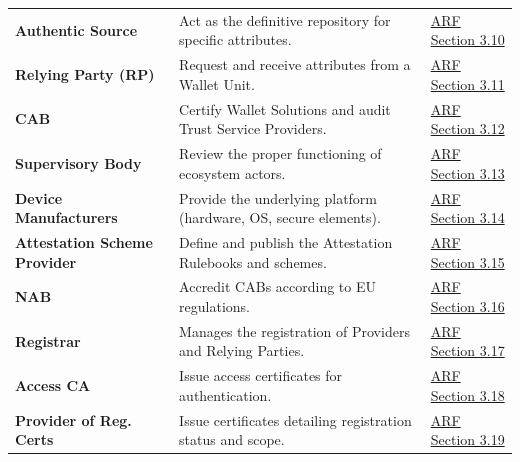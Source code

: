 \documentclass{article}
\begin{document}
\begin{table}[htbp]
\begin{tabularx}{\textwidth}{@{}l L l@{}}
        \textbf{Authentic Source} & Act as the definitive repository for specific attributes. & \href{https://eudi.dev/latest/architecture-and-reference-framework-main/\#310-authentic-sources}{ARF Section 3.10} \\
        \textbf{Relying Party (RP)} & Request and receive attributes from a Wallet Unit. & \href{https://eudi.dev/latest/architecture-and-reference-framework-main/\#311-relying-parties-relying-party-instances-and-intermediaries}{ARF Section 3.11} \\
        \textbf{CAB} & Certify Wallet Solutions and audit Trust Service Providers. & \href{https://eudi.dev/latest/architecture-and-reference-framework-main/\#312-conformity-assessment-bodies-cab}{ARF Section 3.12} \\
        \textbf{Supervisory Body} & Review the proper functioning of ecosystem actors. & \href{https://eudi.dev/latest/architecture-and-reference-framework-main/\#313-supervisory-bodies}{ARF Section 3.13} \\
        \textbf{Device Manufacturers} & Provide the underlying platform (hardware, OS, secure elements). & \href{https://eudi.dev/latest/architecture-and-reference-framework-main/\#314-device-manufacturers-and-related-subsystems-providers}{ARF Section 3.14} \\
        \textbf{Attestation Scheme Provider} & Define and publish the Attestation Rulebooks and schemes. & \href{https://eudi.dev/latest/architecture-and-reference-framework-main/\#315-attestation-scheme-providers-for-qeaas-pub-eaas-and-eaas}{ARF Section 3.15} \\
        \textbf{NAB} & Accredit CABs according to EU regulations. & \href{https://eudi.dev/latest/architecture-and-reference-framework-main/\#316-national-accreditation-bodies}{ARF Section 3.16} \\
        \textbf{Registrar} & Manages the registration of Providers and Relying Parties. & \href{https://eudi.dev/latest/architecture-and-reference-framework-main/\#317-registrars}{ARF Section 3.17} \\
        \textbf{Access CA} & Issue access certificates for authentication. & \href{https://eudi.dev/latest/architecture-and-reference-framework-main/\#318-access-certificate-authorities}{ARF Section 3.18} \\
        \textbf{Provider of Reg. Certs} & Issue certificates detailing registration status and scope. & \href{https://eudi.dev/latest/architecture-and-reference-framework-main/\#319-providers-of-registration-certificates}{ARF Section 3.19} \\
        \bottomrule
    \end{tabularx}
\end{table}
\end{document}
